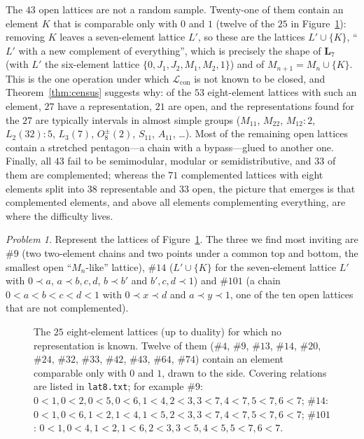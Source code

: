 \documentclass[11pt]{article}
\theoremstyle{remark}
\newtheorem{problem}[theorem]{Problem}
\newcommand{\LL}{\mathbf{L}_7}
\newcommand{\Lcon}{\mathcal L_{\mathrm{con}}}
\newcommand{\lat}[1]{\##1}
\begin{document}
The $43$ open lattices are not a random sample. Twenty-one of them contain an element $K$ that is
comparable only with $0$ and $1$ (twelve of the $25$ in Figure~\ref{fig:open}): removing $K$ leaves a
seven-element lattice $L'$, so these are the lattices $L'\cup\{K\}$, ``$L'$ with a new complement
of everything'', which is precisely the shape of $\LL$ (with $L'$ the six-element lattice
$\{0,J_1,J_2,M_1,M_2,1\}$) and of $M_{n+1}=M_n\cup\{K\}$. This is the one operation under which
$\Lcon$ is not known to be closed, and Theorem~\ref{thm:census} suggests why: of the $53$
eight-element lattices with such an element, $27$ have a representation, $21$ are open, and the
representations found for the $27$ are typically intervals in almost simple groups
($M_{11}$, $M_{22}$, $M_{12}{:}2$, $L_2(32){:}5$, $L_3(7)$, $O_8^\pm(2)$, $S_{11}$, $A_{11}$, \dots).
Most of the remaining open lattices contain a stretched pentagon---a chain with a bypass---glued to
another one. Finally, all $43$ fail to be semimodular, modular or semidistributive, and $33$ of them are
complemented; whereas the $71$ complemented lattices with eight elements split into $38$ representable
and $33$ open, the picture that emerges is that complemented elements, and above all elements
complementing everything, are where the difficulty lives.

\begin{problem}
Represent the lattices of Figure~\ref{fig:open}. The three we find most inviting are
$\lat{9}$ (two two-element chains and two points under a common top and bottom, the
smallest open ``$M_n$-like'' lattice), $\lat{14}$ ($L'\cup\{K\}$ for the seven-element lattice $L'$ with $0\prec a$, $a\prec b,c,d$, $b\prec b'$ and $b',c,d\prec 1$) and $\lat{101}$ (a chain $0<a<b<c<d<1$ with $0\prec x\prec d$ and
$a\prec y\prec 1$, one of the ten open lattices that are not complemented).
\end{problem}

\begin{figure}[p]
\centering

\caption{The $25$ eight-element lattices (up to duality) for which no representation is known.
Twelve of them ($\lat4$, $\lat9$, $\lat{13}$, $\lat{14}$, $\lat{20}$, $\lat{24}$, $\lat{32}$, $\lat{33}$, $\lat{42}$, $\lat{43}$, $\lat{64}$, $\lat{74}$) contain an element comparable only with $0$ and $1$, drawn to the side.
Covering relations are listed in \texttt{lat8.txt}; for example
$\lat{9}$: $0{<}1,0{<}2,0{<}5,0{<}6,1{<}4,2{<}3,3{<}7,4{<}7,5{<}7,6{<}7$;
$\lat{14}$: $0{<}1,0{<}6,1{<}2,1{<}4,1{<}5,2{<}3,3{<}7,4{<}7,5{<}7,6{<}7$;
$\lat{101}$: $0{<}1,0{<}4,1{<}2,1{<}6,2{<}3,3{<}5,4{<}5,5{<}7,6{<}7$.}
\label{fig:open}
\end{figure}
\end{document}
